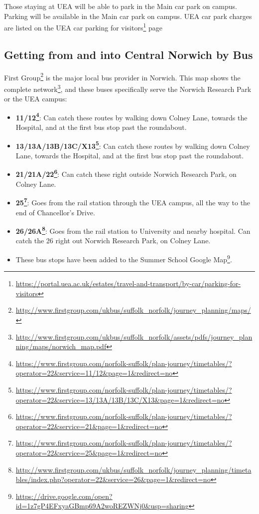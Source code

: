 \documentclass[12pt,]{book}
\providecommand{\tightlist}{%
  \setlength{\itemsep}{0pt}\setlength{\parskip}{0pt}}
\let\rmarkdownfootnote\footnote%
\def\footnote{\protect\rmarkdownfootnote}
\renewcommand{\href}[2]{#2\footnote{\url{#1}}}
\theoremstyle{definition}
\theoremstyle{definition}
\theoremstyle{remark}
\begin{document}
Those staying at UEA will be able to park in the Main car park on
campus. Parking will be available in the Main car park on campus. UEA
car park charges are listed on the
\href{https://portal.uea.ac.uk/estates/travel-and-transport/by-car/parking-for-visitors}{UEA
car parking for visitors} page

\subsection*{Getting from and into Central Norwich by
Bus}\label{getting-from-and-into-central-norwich-by-bus}

\href{http://www.firstgroup.com/ukbus/suffolk_norfolk/journey_planning/maps/}{First
Group} is the major local bus provider in Norwich.
\href{http://www.firstgroup.com/ukbus/suffolk_norfolk/assets/pdfs/journey_planning/maps/norwich_map.pdf}{This
map shows the complete network}, and these buses specifically serve the
Norwich Research Park or the UEA campus:

\begin{itemize}
\tightlist
\item
  \textbf{\href{https://www.firstgroup.com/norfolk-suffolk/plan-journey/timetables/?operator=22\&service=11/12\&page=1\&redirect=no}{11/12}}:
  Can catch these routes by walking down Colney Lane, towards the
  Hospital, and at the first bus stop past the roundabout.
\item
  \textbf{\href{https://www.firstgroup.com/norfolk-suffolk/plan-journey/timetables/?operator=22\&service=13/13A/13B/13C/X13\&page=1\&redirect=no}{13/13A/13B/13C/X13}}:
  Can catch these routes by walking down Colney Lane, towards the
  Hospital, and at the first bus stop past the roundabout.
\item
  \textbf{\href{https://www.firstgroup.com/norfolk-suffolk/plan-journey/timetables/?operator=22\&service=21\&page=1\&redirect=no}{21/21A/22}}:
  Can catch these right outside Norwich Research Park, on Colney Lane.
\item
  \textbf{\href{https://www.firstgroup.com/norfolk-suffolk/plan-journey/timetables/?operator=22\&service=25\&page=1\&redirect=no}{25}}:
  Goes from the rail station through the UEA campus, all the way to the
  end of Chancellor's Drive.
\item
  \textbf{\href{http://www.firstgroup.com/ukbus/suffolk_norfolk/journey_planning/timetables/index.php?operator=22\&service=26\&page=1\&redirect=no}{26/26A}}:
  Goes from the rail station to University and nearby hospital. Can
  catch the 26 right out Norwich Research Park, on Colney Lane.
\item
  These bus stops have been added to the
  \href{https://drive.google.com/open?id=1z7gP4EFxyaGBmp69A2woREZWNj0\&usp=sharing}{Summer
  School Google Map}.
\end{itemize}
\end{document}
